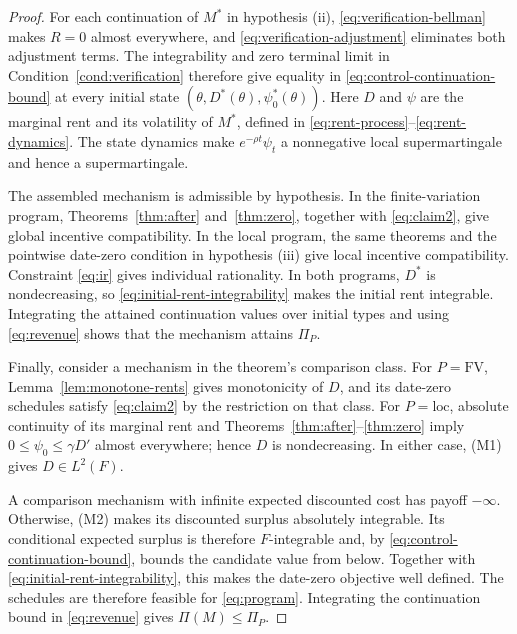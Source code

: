 \documentclass[12pt]{article}
\begin{document}
\begin{proof}
For each continuation of \(M^*\) in hypothesis \textnormal{(ii)},
\eqref{eq:verification-bellman} makes \(R=0\) almost everywhere,
and \eqref{eq:verification-adjustment} eliminates both adjustment
terms. The integrability and zero terminal limit in
Condition~\ref{cond:verification} therefore give equality in
\eqref{eq:control-continuation-bound} at every initial state
\((\theta,D^*(\theta),\psi_0^*(\theta))\).
Here \(D\) and \(\psi\) are the marginal rent and its volatility
of \(M^*\), defined in
\eqref{eq:rent-process}--\eqref{eq:rent-dynamics}.
The state dynamics make \(e^{-\rho t}\psi_t\) a nonnegative
local supermartingale and hence a supermartingale.

The assembled mechanism is admissible by hypothesis. In the
finite-variation program, Theorems~\ref{thm:after}
and~\ref{thm:zero}, together with \eqref{eq:claim2}, give global
incentive compatibility. In the local program, the same theorems
and the pointwise date-zero condition in hypothesis
\textnormal{(iii)} give local incentive compatibility. Constraint
\eqref{eq:ir} gives individual rationality. In both programs,
\(D^*\) is nondecreasing, so
\eqref{eq:initial-rent-integrability} makes the initial rent
integrable. Integrating the attained continuation values over initial
types and using \eqref{eq:revenue} shows that the mechanism attains
\(\Pi_P\).

Finally, consider a mechanism in the theorem's comparison class.
For \(P=\mathrm{FV}\), Lemma~\ref{lem:monotone-rents} gives
monotonicity of \(D\), and its date-zero schedules satisfy
\eqref{eq:claim2} by the restriction on that class. For
\(P=\mathrm{loc}\), absolute continuity of its marginal rent and
Theorems~\ref{thm:after}--\ref{thm:zero} imply
\(0\leq\psi_0\leq\gamma D'\) almost everywhere; hence \(D\) is
nondecreasing. In either case, (M1) gives \(D\in L^2(F)\).

A comparison mechanism with infinite expected discounted cost has
payoff \(-\infty\). Otherwise, (M2) makes its discounted surplus
absolutely integrable. Its conditional expected surplus is therefore
\(F\)-integrable and, by \eqref{eq:control-continuation-bound},
bounds the candidate value from below. Together with
\eqref{eq:initial-rent-integrability}, this makes the date-zero
objective well defined. The schedules are therefore feasible for
\eqref{eq:program}. Integrating the continuation bound in
\eqref{eq:revenue} gives \(\Pi(M)\leq\Pi_P\).
\end{proof}
\end{document}

